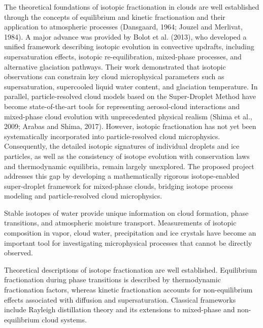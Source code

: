 \documentclass[11pt,a4paper]{article}
\begin{document}
The theoretical foundations of isotopic fractionation in clouds are well established through
the concepts of equilibrium and kinetic fractionation and their application to atmospheric processes
(Dansgaard, 1964; Jouzel and Merlivat, 1984).
A major advance was provided by Bolot et al. (2013),
who developed a unified framework describing isotopic evolution in convective updrafts,
including supersaturation effects, isotopic re-equilibration, mixed-phase processes,
and alternative glaciation pathways.
Their work demonstrated that isotopic observations can constrain key
cloud microphysical parameters such as supersaturation, supercooled liquid water content,
and glaciation temperature.
In parallel, particle-resolved cloud models based on the Super-Droplet Method have become
state-of-the-art tools for representing aerosol-cloud interactions and
mixed-phase cloud evolution with unprecedented physical realism (Shima et al., 2009; Arabas and Shima, 2017).
However, isotopic fractionation has not yet been systematically incorporated into particle-resolved cloud microphysics.
Consequently, the detailed isotopic signatures of individual droplets and ice particles,
as well as the consistency of isotope evolution with conservation laws and thermodynamic equilibria,
remain largely unexplored.
The proposed project addresses this gap by developing a mathematically
rigorous isotope-enabled super-droplet framework for mixed-phase clouds,
bridging isotope process modeling and particle-resolved cloud microphysics.

Stable isotopes of water 
provide unique information on cloud formation, phase transitions, and atmospheric moisture transport.
Measurements of isotopic composition in vapor, cloud water, precipitation and ice crystals
have become an important tool for investigating microphysical processes that cannot be directly observed.

Theoretical descriptions of isotope fractionation are well established.
Equilibrium fractionation during phase transitions is described by thermodynamic fractionation factors,
whereas kinetic fractionation accounts for non-equilibrium effects associated
with diffusion and supersaturation.
Classical frameworks include Rayleigh distillation theory and its extensions
to mixed-phase and non-equilibrium cloud systems.
\end{document}

